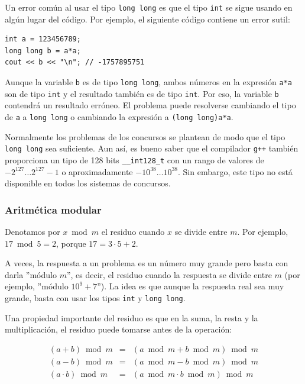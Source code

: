Un error común al usar el tipo \texttt{long long}
es que el tipo \texttt{int} se sigue usando en algún lugar
del código.
Por ejemplo, el siguiente código contiene
un error sutil:

\begin{lstlisting}
int a = 123456789;
long long b = a*a;
cout << b << "\n"; // -1757895751
\end{lstlisting}

Aunque la variable \texttt{b} es de tipo \texttt{long long},
ambos números en la expresión \texttt{a*a}
son de tipo \texttt{int} y el resultado
también es de tipo \texttt{int}.
Por eso, la variable \texttt{b}
contendrá un resultado erróneo.
El problema puede resolverse cambiando el tipo
de \texttt{a} a \texttt{long long} o
cambiando la expresión a \texttt{(long long)a*a}.

Normalmente los problemas de los concursos se plantean de modo que el
tipo \texttt{long long} sea suficiente.
Aun así, es bueno saber que
el compilador \texttt{g++} también proporciona
un tipo de 128 bits \texttt{\_\_int128\_t}
con un rango de valores de
$-2^{127} \ldots 2^{127}-1$ o aproximadamente $-10^{38} \ldots 10^{38}$.
Sin embargo, este tipo no está disponible en todos los sistemas de concursos.

\subsubsection{Aritmética modular}


Denotamos por $x \bmod m$ el residuo
cuando $x$ se divide entre $m$.
Por ejemplo, $17 \bmod 5 = 2$,
porque $17 = 3 \cdot 5 + 2$.

A veces, la respuesta a un problema es un
número muy grande pero basta con
darla ''módulo $m$'', es decir,
el residuo cuando la respuesta se divide entre $m$
(por ejemplo, ''módulo $10^9+7$'').
La idea es que aunque la respuesta real
sea muy grande,
basta con usar los tipos
\texttt{int} y \texttt{long long}.

Una propiedad importante del residuo es que
en la suma, la resta y la multiplicación,
el residuo puede tomarse antes de la operación:

\[
\begin{array}{rcr}
(a+b) \bmod m & = & (a \bmod m + b \bmod m) \bmod m \\
(a-b) \bmod m & = & (a \bmod m - b \bmod m) \bmod m \\
(a \cdot b) \bmod m & = & (a \bmod m \cdot b \bmod m) \bmod m
\end{array}
\]

